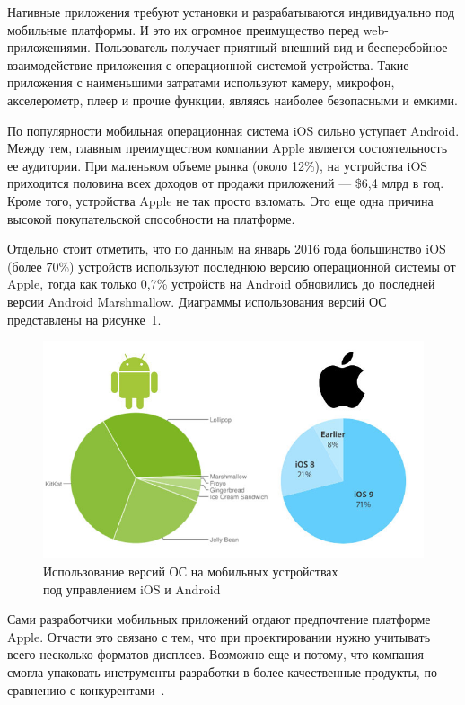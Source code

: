 Нативные приложения требуют установки и разрабатываются индивидуально
под мобильные платформы. И это их огромное преимущество перед web-приложениями.
Пользователь получает приятный внешний вид и бесперебойное
взаимодействие приложения с операционной системой устройства.
Такие приложения с наименьшими затратами используют камеру,
микрофон, акселерометр, плеер и прочие функции,
являясь наиболее безопасными и емкими.

По популярности мобильная операционная система iOS сильно уступает Android.
Между тем, главным преимуществом компании Apple является
состоятельность ее аудитории. При маленьком объеме рынка (около 12\%),
на устройства iOS приходится половина всех доходов
от продажи приложений --- \$6,4 млрд в год.
Кроме того, устройства Apple не так просто взломать.
Это еще одна причина высокой покупательской способности на платформе.

Отдельно стоит отметить, что по данным на январь 2016 года большинство
iOS (более 70\%) устройств используют
последнюю версию операционной системы от Apple, тогда как только 0,7\%
устройств на Android обновились до последней версии Android Marshmallow.
Диаграммы использования версий ОС представлены на рисунке~\ref{fig:ios_android_os_version}.

\begin{figure}[h!]
  \centering
  \includegraphics[width=150mm]{fig/ios_android_os_version}
  \caption{Использование версий ОС на мобильных устройствах \\ под управлением iOS и Android}
  \label{fig:ios_android_os_version}
\end{figure}

Сами разработчики мобильных приложений отдают предпочтение платформе Apple.
Отчасти это связано с тем, что при проектировании нужно учитывать всего
несколько форматов дисплеев. Возможно еще и потому,
что компания смогла упаковать инструменты разработки в более качественные
продукты, по сравнению с конкурентами~\cite{ios_android_compare}.

